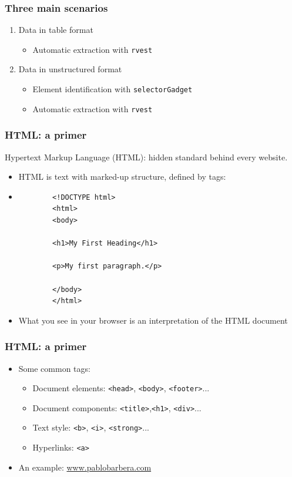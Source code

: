 \documentclass{beamer}
\begin{document}
\begin{frame}
	\frametitle{Three main scenarios}
	
	\begin{enumerate}[<+->]
		
		\item Data in \alert{table} format
		\begin{itemize}
			\item Automatic extraction with \texttt{rvest}
		\end{itemize}
		\vspace{.25cm}
		\item Data in \alert{unstructured} format
		\begin{itemize}
			\item Element identification with \texttt{selectorGadget}
			\item Automatic extraction with \texttt{rvest}
		\end{itemize}
		\vspace{.25cm}
	
		
	\end{enumerate}
	
\end{frame}

\begin{frame}[fragile]
	\frametitle{HTML: a primer}
	Hypertext Markup Language (HTML): hidden standard behind every website. \pause
	\begin{itemize}
		\item HTML is text with marked-up structure, defined by \alert{tags}:
		\item\begin{verbatim}
		<!DOCTYPE html>
		<html>
		<body>
		
		<h1>My First Heading</h1>
		
		<p>My first paragraph.</p>
		
		</body>
		</html>
		\end{verbatim}
		\item What you see in your browser is an interpretation of the HTML document
	\end{itemize}
	
\end{frame}

\begin{frame}[fragile]
	\frametitle{HTML: a primer}
	\begin{itemize}[<+->]
		\item Some common tags:
		\begin{itemize}
			\item Document elements: \verb|<head>|, \verb|<body>|, \verb|<footer>|...
			\item Document components: \verb|<title>|,\verb|<h1>|, \verb|<div>|...
			\item Text style: \verb|<b>|, \verb|<i>|, \verb|<strong>|...
			\item Hyperlinks: \verb|<a>|
		\end{itemize}
		\item  An example: \href{http://www.pablobarbera.com}{www.pablobarbera.com}
	\end{itemize}
\end{frame}
\end{document}
